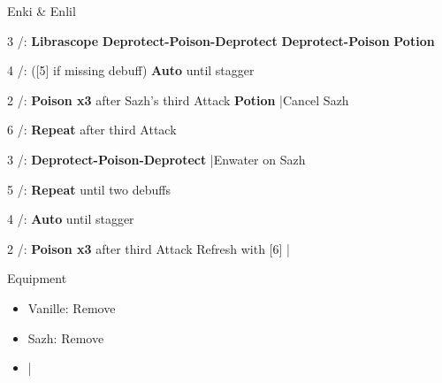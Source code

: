 \begin{fight}{Enki \& Enlil}
	\item [3] \sab/\syn: \textbf{Librascope} \to \textbf{Deprotect-Poison-Deprotect} \to \textbf{Deprotect-Poison} \to \textbf{Potion}
	\item [4] \rav/\rav: ([5] if missing debuff) \textbf{Auto} until stagger
	\item [2] \sab/\com: \textbf{Poison x3} after Sazh's third Attack \to \textbf{\textbf{Potion}} |Cancel Sazh
	\item [6] \sab/\com: \textbf{Repeat} after third Attack
	\item [3] \sab/\syn: \textbf{Deprotect-Poison-Deprotect} |Enwater on Sazh
	\item [5] \sab/\rav: \textbf{Repeat} until two debuffs
	\item [4] \rav/\rav: \textbf{Auto} until stagger
	\item [2] \sab/\com: \textbf{Poison x3} after third Attack \to Refresh with [6] |\skip
\end{fight}
\begin{menu}
	\item Equipment
	\begin{itemize}
		\item Vanille: Remove
		\item Sazh: Remove
	\end{itemize}
\end{menu}
\begin{itemize}
	\item \skip|\save
\end{itemize}
